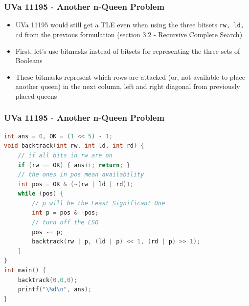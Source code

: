 \documentclass{beamer}
\begin{document}
\begin{frame}[fragile]
\frametitle{UVa 11195 - Another n-Queen Problem}

\begin{itemize}
    \item UVa 11195 would still get a TLE even when using the three bitsets \verb|rw, ld, rd| from the previous formulation (section 3.2 - Recursive Complete Search)
    \item First, let's use bitmasks instead of bitsets for representing the three sets of Booleans
    \item These bitmasks represent which rows are attacked (or, not available to place another queen) in the next column, left and right diagonal from previously placed queens
\end{itemize}

\end{frame}

\begin{frame}[fragile]
\frametitle{UVa 11195 - Another n-Queen Problem}

\begin{lstlisting}[language=C]
int ans = 0, OK = (1 << 5) - 1;
void backtrack(int rw, int ld, int rd) {
	// if all bits in rw are on
	if (rw == OK) { ans++; return; } 
	// the ones in pos mean availability
	int pos = OK & (~(rw | ld | rd));
	while (pos) {
		// p will be the Least Significant One
		int p = pos & -pos;
		// turn off the LSO
		pos -= p;
		backtrack(rw | p, (ld | p) << 1, (rd | p) >> 1);
	}
}
int main() {
	backtrack(0,0,0);
	printf("\%d\n", ans);
}

\end{lstlisting}

\end{frame}
\end{document}
